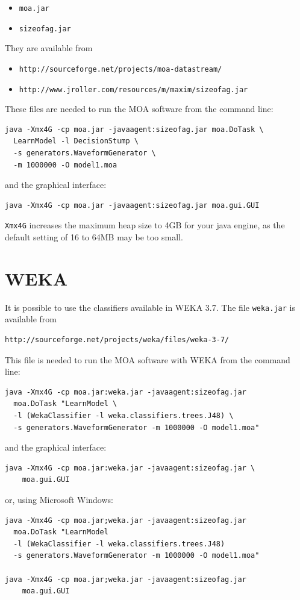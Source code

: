 \documentclass[a4paper,12pt,twoside]{book}
\begin{document}
\begin{itemize}
\item \texttt{moa.jar}
\item \texttt{sizeofag.jar}
\end{itemize}
They are available from
\begin{itemize}
\item \texttt{http://sourceforge.net/projects/moa-datastream/}
\item \texttt{http://www.jroller.com/resources/m/maxim/sizeofag.jar}
\end{itemize}
These files are needed to run the MOA software from the command line:
\begin{verbatim}
java -Xmx4G -cp moa.jar -javaagent:sizeofag.jar moa.DoTask \
  LearnModel -l DecisionStump \
  -s generators.WaveformGenerator \
  -m 1000000 -O model1.moa
\end{verbatim}
 and the graphical interface:
\begin{verbatim}
java -Xmx4G -cp moa.jar -javaagent:sizeofag.jar moa.gui.GUI
\end{verbatim}

\texttt{Xmx4G} increases the maximum heap size to 4GB for your java engine, as
the default setting of 16 to 64MB may be too small. 


\section{WEKA}
\label{sec:InstWeka}

It is possible to use the classifiers available in WEKA 3.7. The file \texttt{weka.jar} is available from
\begin{verbatim}
http://sourceforge.net/projects/weka/files/weka-3-7/
\end{verbatim}

This file is needed to run the MOA software with WEKA from the command line:
\begin{verbatim}
java -Xmx4G -cp moa.jar:weka.jar -javaagent:sizeofag.jar 
  moa.DoTask "LearnModel \
  -l (WekaClassifier -l weka.classifiers.trees.J48) \ 
  -s generators.WaveformGenerator -m 1000000 -O model1.moa"
\end{verbatim}
and the graphical interface:
\begin{verbatim}
java -Xmx4G -cp moa.jar:weka.jar -javaagent:sizeofag.jar \
    moa.gui.GUI
\end{verbatim}
or, using Microsoft Windows:
\begin{verbatim}
java -Xmx4G -cp moa.jar;weka.jar -javaagent:sizeofag.jar
  moa.DoTask "LearnModel 
  -l (WekaClassifier -l weka.classifiers.trees.J48)                  
  -s generators.WaveformGenerator -m 1000000 -O model1.moa"

java -Xmx4G -cp moa.jar;weka.jar -javaagent:sizeofag.jar 
    moa.gui.GUI
\end{verbatim}
\end{document}
